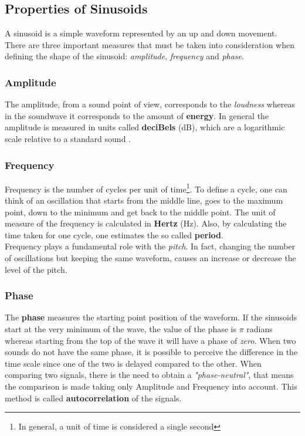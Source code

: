 \subsection{Properties of Sinusoids}
\label{sub:prop_of_sinusoids}
A sinusoid is a simple waveform represented by an up and down movement. There are three important measures that must be taken into consideration when defining the shape of the sinusoid: \textit{amplitude}, \textit{frequency} and \textit{phase}.

\subsubsection{Amplitude}
The amplitude, from a sound point of view, corresponds to the \textit{loudness} whereas in the soundwave it corresponds to the amount of \textbf{energy}. In general the amplitude is measured in units called \textbf{deciBels} (dB), which are a logarithmic scale relative to a standard sound \cite{prop_of_sinusoids}.

\subsubsection{Frequency}
Frequency is the number of cycles per unit of time\footnote{In general, a unit of time is considered a single second}. To define a cycle, one can think of an oscillation that starts from the middle line, goes to the maximum point, down to the minimum and get back to the middle point. The unit of measure of the frequency is calculated in \textbf{Hertz} (Hz). Also, by calculating the time taken for one cycle, one estimates the so called \textbf{period}. \\
\noindent Frequency plays a fundamental role with the \textit{pitch}. In fact, changing the number of oscillations but keeping the same waveform, causes an increase or decrease the level of the pitch.

\subsubsection{Phase}
The \textbf{phase} measures the starting point position of the waveform. If the sinusoids start at the very minimum of the wave, the value of the phase is $\pi$ radians whereas starting from the top of the wave it will have a phase of \textit{zero}. When two sounds do not have the same phase, it is possible to perceive the difference in the time scale since one of the two is delayed compared to the other. When comparing two signals, there is the need to obtain a \textit{"phase-neutral"}, that means the comparison is made taking only Amplitude and Frequency into account. This method is called \textbf{autocorrelation} of the signals.

